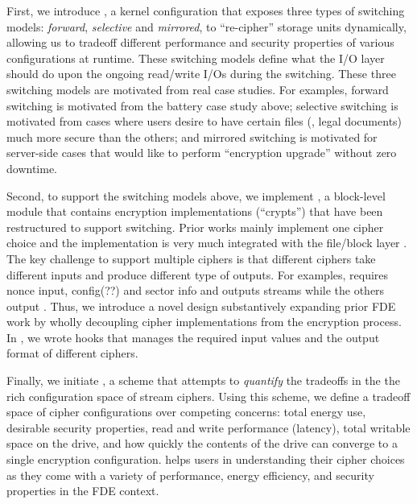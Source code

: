 First, we introduce \sysA, a kernel configuration that exposes three types of
switching models: {\em forward}, {\em selective} and {\em mirrored}, to
``re-cipher'' storage units dynamically, allowing us to tradeoff different
performance and security properties of various configurations at runtime. These
switching models define what the I/O layer should do upon the ongoing read/write
I/Os during the switching. These three switching models are motivated from real
case studies. For examples, forward switching is motivated from the battery case
study above; selective switching is motivated from cases where users desire to
have certain files (\eg, legal documents) much more secure than the others; and
mirrored switching is motivated for server-side cases that would like to perform
``encryption upgrade'' without zero downtime.

Second, to support the switching models above, we implement \sysB, a block-level
module that contains encryption implementations (``crypts'') that have been
restructured to support switching. Prior works mainly implement one cipher
choice and the implementation is very much integrated with the file/block layer
\cite{StrongBox, any-other-works-like-this?}. The key challenge to support
multiple ciphers is that different ciphers take different inputs and produce
different type of outputs. For examples, \encA requires nonce input, \encB
config(??\xxx) and \encC sector info and \encC outputs streams while the others
output \xxx. Thus, we introduce a novel design substantively expanding prior FDE
work by wholly decoupling cipher implementations from the encryption process. In
\sysB, we wrote hooks that manages the required input values and the output
format of different ciphers.

Finally, we initiate \sysC, a scheme that attempts to {\em quantify} the
tradeoffs in the the rich configuration space of stream ciphers. Using this
scheme, we define a tradeoff space of cipher configurations over competing
concerns: total energy use, desirable security properties, read and write
performance (latency), total writable space on the drive, and how quickly the
contents of the drive can converge to a single encryption configuration. \sysC
helps users in understanding their cipher choices as they come with a variety of
performance, energy efficiency, and security properties in the FDE context.

